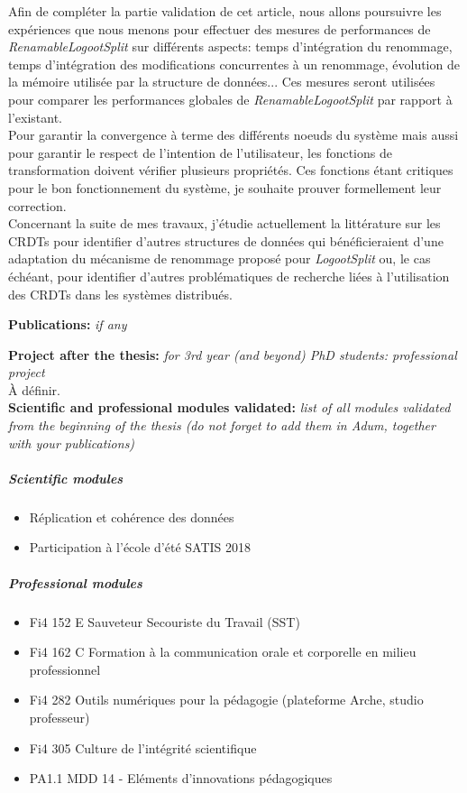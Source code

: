 \documentclass[12pt]{article}
\newcommand{\commentaire}[1]{\small\textit{#1}}
\begin{document}
Afin de compléter la partie validation de cet article, nous allons poursuivre les expériences que nous menons pour effectuer des mesures de performances de \emph{RenamableLogootSplit} sur différents aspects: temps d'intégration du renommage, temps d'intégration des modifications concurrentes à un renommage, évolution de la mémoire utilisée par la structure de données...
Ces mesures seront utilisées pour comparer les performances globales de \emph{RenamableLogootSplit} par rapport à l'existant.
\\

Pour garantir la convergence à terme des différents noeuds du système mais aussi pour garantir le respect de l'intention de l'utilisateur, les fonctions de transformation doivent vérifier plusieurs propriétés.
Ces fonctions étant critiques pour le bon fonctionnement du système, je souhaite prouver formellement leur correction.
\\

Concernant la suite de mes travaux, j'étudie actuellement la littérature sur les \acp{CRDT} pour identifier d'autres structures de données qui bénéficieraient d'une adaptation du mécanisme de renommage proposé pour \emph{LogootSplit} ou, le cas échéant, pour identifier d'autres problématiques de recherche liées à l'utilisation des \acp{CRDT} dans les systèmes distribués.
\\

\clearpage

\noindent\textbf{Publications:}
\commentaire{%
  if any}


\nocite{*}

\noindent\textbf{Project after the thesis:}
\commentaire{%
  for 3rd year (and beyond) PhD students: professional project\\}
À définir.
\\

\noindent\textbf{Scientific and professional modules validated:}
\commentaire{%
  list of all modules validated from the beginning of the thesis (do
  not forget to add them in Adum, together with your publications)}
\subparagraph{Scientific modules}
  \begin{itemize}
      \item Réplication et cohérence des données
      \item Participation à l'école d'été SATIS 2018
  \end{itemize}
\subparagraph{Professional modules}
  \begin{itemize}
      \item Fi4 152 E Sauveteur Secouriste du Travail (SST)
      \item Fi4 162 C Formation à la communication orale et corporelle en milieu professionnel
      \item Fi4 282 Outils numériques pour la pédagogie (plateforme Arche, studio professeur)
      \item Fi4 305 Culture de l’intégrité scientifique
      \item PA1.1 MDD 14 - Eléments d’innovations pédagogiques
  \end{itemize}
\end{document}
